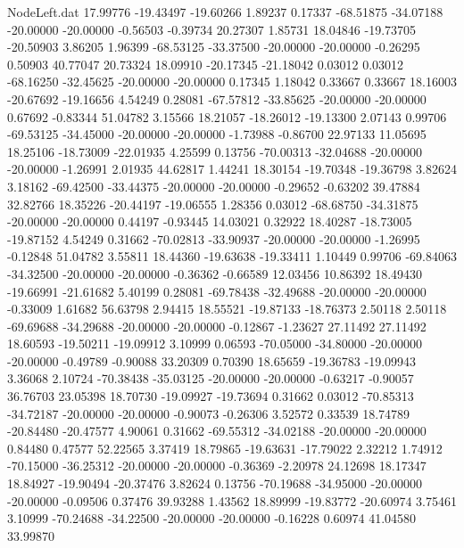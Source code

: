 \begin{filecontents}{NodeLeft.dat}
  17.99776  -19.43497  -19.60266     1.89237    0.17337  -68.51875  -34.07188  -20.00000  -20.00000   -0.56503   -0.39734   20.27307    1.85731
  18.04846  -19.73705  -20.50903     3.86205    1.96399  -68.53125  -33.37500  -20.00000  -20.00000   -0.26295    0.50903   40.77047   20.73324
  18.09910  -20.17345  -21.18042     0.03012    0.03012  -68.16250  -32.45625  -20.00000  -20.00000    0.17345    1.18042    0.33667    0.33667
  18.16003  -20.67692  -19.16656     4.54249    0.28081  -67.57812  -33.85625  -20.00000  -20.00000    0.67692   -0.83344   51.04782    3.15566
  18.21057  -18.26012  -19.13300     2.07143    0.99706  -69.53125  -34.45000  -20.00000  -20.00000   -1.73988   -0.86700   22.97133   11.05695
  18.25106  -18.73009  -22.01935     4.25599    0.13756  -70.00313  -32.04688  -20.00000  -20.00000   -1.26991    2.01935   44.62817    1.44241
  18.30154  -19.70348  -19.36798     3.82624    3.18162  -69.42500  -33.44375  -20.00000  -20.00000   -0.29652   -0.63202   39.47884   32.82766
  18.35226  -20.44197  -19.06555     1.28356    0.03012  -68.68750  -34.31875  -20.00000  -20.00000    0.44197   -0.93445   14.03021    0.32922
  18.40287  -18.73005  -19.87152     4.54249    0.31662  -70.02813  -33.90937  -20.00000  -20.00000   -1.26995   -0.12848   51.04782    3.55811
  18.44360  -19.63638  -19.33411     1.10449    0.99706  -69.84063  -34.32500  -20.00000  -20.00000   -0.36362   -0.66589   12.03456   10.86392
  18.49430  -19.66991  -21.61682     5.40199    0.28081  -69.78438  -32.49688  -20.00000  -20.00000   -0.33009    1.61682   56.63798    2.94415
  18.55521  -19.87133  -18.76373     2.50118    2.50118  -69.69688  -34.29688  -20.00000  -20.00000   -0.12867   -1.23627   27.11492   27.11492
  18.60593  -19.50211  -19.09912     3.10999    0.06593  -70.05000  -34.80000  -20.00000  -20.00000   -0.49789   -0.90088   33.20309    0.70390
  18.65659  -19.36783  -19.09943     3.36068    2.10724  -70.38438  -35.03125  -20.00000  -20.00000   -0.63217   -0.90057   36.76703   23.05398
  18.70730  -19.09927  -19.73694     0.31662    0.03012  -70.85313  -34.72187  -20.00000  -20.00000   -0.90073   -0.26306    3.52572    0.33539
  18.74789  -20.84480  -20.47577     4.90061    0.31662  -69.55312  -34.02188  -20.00000  -20.00000    0.84480    0.47577   52.22565    3.37419
  18.79865  -19.63631  -17.79022     2.32212    1.74912  -70.15000  -36.25312  -20.00000  -20.00000   -0.36369   -2.20978   24.12698   18.17347
  18.84927  -19.90494  -20.37476     3.82624    0.13756  -70.19688  -34.95000  -20.00000  -20.00000   -0.09506    0.37476   39.93288    1.43562
  18.89999  -19.83772  -20.60974     3.75461    3.10999  -70.24688  -34.22500  -20.00000  -20.00000   -0.16228    0.60974   41.04580   33.99870

\end{filecontents}
